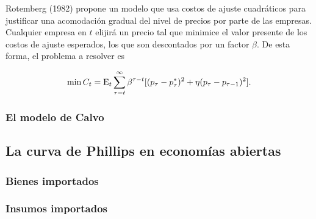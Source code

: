 \documentclass[DeGregorioResumen]{subfiles}
\begin{document}
Rotemberg (1982) propone un modelo que usa costos de ajuste cuadráticos para justificar una acomodación gradual del nivel de precios por parte de las empresas. Cualquier empresa en $t$ elijirá un precio tal que minimice el valor presente de los costos de ajuste esperados, los que son descontados por un factor $\beta$. De esta forma, el problema a resolver es

\begin{equation}
	\min C_t = \operatorname{E}_t \sum_{\tau=t}^\infty \beta^{\tau-t}[(p_\tau - p^*_\tau)^2+\eta(p_\tau-p_{\tau-1})^2].
\end{equation}

\subsubsection{El modelo de Calvo}
\subsection{La curva de Phillips en economías abiertas}
\subsubsection{Bienes importados}
\subsubsection{Insumos importados}
\end{document}
